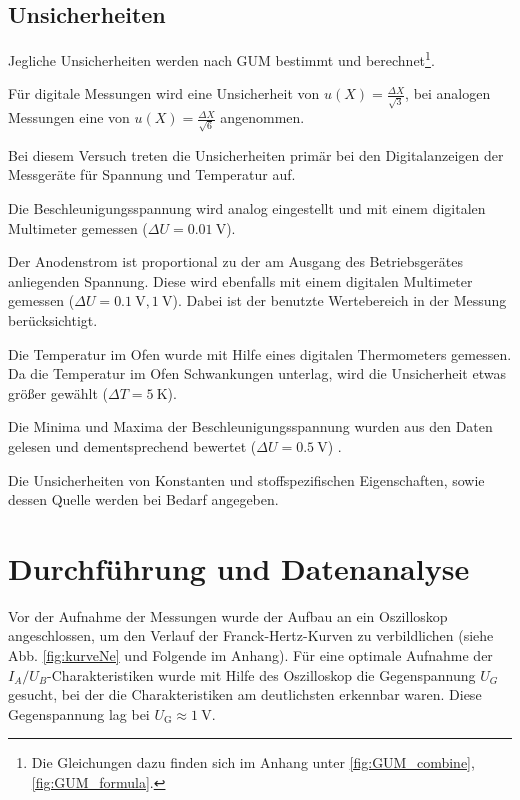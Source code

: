 	\subsection{Unsicherheiten}
	
		Jegliche Unsicherheiten werden nach GUM bestimmt und berechnet\footnote{Die Gleichungen dazu finden sich im Anhang unter \ref{fig:GUM_combine}, \ref{fig:GUM_formula}.}. 

		Für digitale Messungen wird eine Unsicherheit von $u(X) = \frac{\Delta X}{\sqrt{3}}$, bei analogen Messungen eine von $u(X) = \frac{\Delta X}{\sqrt{6}}$ angenommen.
	
		Bei diesem Versuch treten die Unsicherheiten primär bei den Digitalanzeigen der Messgeräte für Spannung und Temperatur auf.
	
		Die Beschleunigungsspannung wird analog eingestellt und mit einem digitalen Multimeter gemessen ($\Delta U = \SI{0.01}{\volt}$).
	
		Der Anodenstrom ist proportional zu der am Ausgang des Betriebsgerätes anliegenden Spannung.
		Diese wird ebenfalls mit einem digitalen Multimeter gemessen ($\Delta U = \SI{0.1}{\volt}, \SI{1}{\volt}$).
		Dabei ist der benutzte Wertebereich in der Messung berücksichtigt.
		
		Die Temperatur im Ofen wurde mit Hilfe eines digitalen Thermometers gemessen.
		Da die Temperatur im Ofen Schwankungen unterlag, wird die Unsicherheit etwas größer gewählt ($\Delta T = \SI{5}{\kelvin}$).
		
		Die Minima und Maxima der Beschleunigungsspannung wurden aus den Daten gelesen und dementsprechend bewertet ($\Delta U = \SI{0.5}{\volt}$) .
		
		Die Unsicherheiten von Konstanten und stoffspezifischen Eigenschaften, sowie dessen Quelle werden bei Bedarf angegeben.

\section{Durchführung und Datenanalyse}
	
	Vor der Aufnahme der Messungen wurde der Aufbau an ein Oszilloskop angeschlossen, um den Verlauf der Franck-Hertz-Kurven zu verbildlichen (siehe Abb. \ref{fig:kurveNe} und Folgende im Anhang).
	Für eine optimale Aufnahme der $I_A/U_B$-Charakteristiken wurde mit Hilfe des Oszilloskop die Gegenspannung $U_G$ gesucht, bei der die Charakteristiken am deutlichsten erkennbar waren.
	Diese Gegenspannung lag bei $ U_\text{G} \approx \SI{1}{\volt}$.
	
